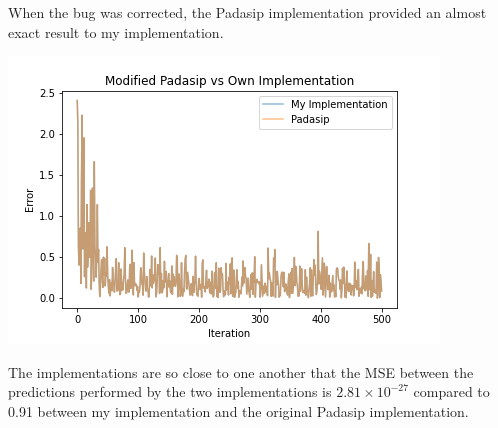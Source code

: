 When the bug was corrected, the Padasip implementation provided an almost exact result to my implementation.

\includegraphics[width=\linewidth]{figs/ModPadasip.png}

The implementations are so close to one another that the MSE between the predictions performed by the two implementations is $2.81 \times 10^{-27}$ compared to 0.91 between my implementation and the original Padasip implementation. 